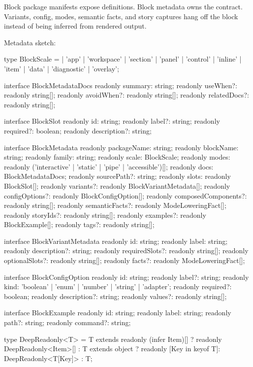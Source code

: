 Block package manifests expose definitions. Block metadata owns the contract. Variants, config, modes, semantic facts, and story captures hang off the block instead of being inferred from rendered output.

Metadata sketch:

\begin{CodeBlock}
type BlockScale =
  | 'app'
  | 'workspace'
  | 'section'
  | 'panel'
  | 'control'
  | 'inline'
  | 'item'
  | 'data'
  | 'diagnostic'
  | 'overlay';

interface BlockMetadataDocs {
  readonly summary: string;
  readonly useWhen?: readonly string[];
  readonly avoidWhen?: readonly string[];
  readonly relatedDocs?: readonly string[];
}

interface BlockSlot {
  readonly id: string;
  readonly label?: string;
  readonly required?: boolean;
  readonly description?: string;
}

interface BlockMetadata {
  readonly packageName: string;
  readonly blockName: string;
  readonly family: string;
  readonly scale: BlockScale;
  readonly modes: readonly ('interactive' | 'static' | 'pipe' | 'accessible')[];
  readonly docs: BlockMetadataDocs;
  readonly sourcePath?: string;
  readonly slots: readonly BlockSlot[];
  readonly variants?: readonly BlockVariantMetadata[];
  readonly configOptions?: readonly BlockConfigOption[];
  readonly composedComponents?: readonly string[];
  readonly semanticFacts?: readonly ModeLoweringFact[];
  readonly storyIds?: readonly string[];
  readonly examples?: readonly BlockExample[];
  readonly tags?: readonly string[];
}

interface BlockVariantMetadata {
  readonly id: string;
  readonly label: string;
  readonly description?: string;
  readonly requiredSlots?: readonly string[];
  readonly optionalSlots?: readonly string[];
  readonly facts?: readonly ModeLoweringFact[];
}

interface BlockConfigOption {
  readonly id: string;
  readonly label?: string;
  readonly kind: 'boolean' | 'enum' | 'number' | 'string' | 'adapter';
  readonly required?: boolean;
  readonly description?: string;
  readonly values?: readonly string[];
}

interface BlockExample {
  readonly id: string;
  readonly label: string;
  readonly path?: string;
  readonly command?: string;
}

type DeepReadonly<T> = T extends readonly (infer Item)[]
  ? readonly DeepReadonly<Item>[]
  : T extends object
    ? { readonly [Key in keyof T]: DeepReadonly<T[Key]> }
    : T;


\end{CodeBlock}
